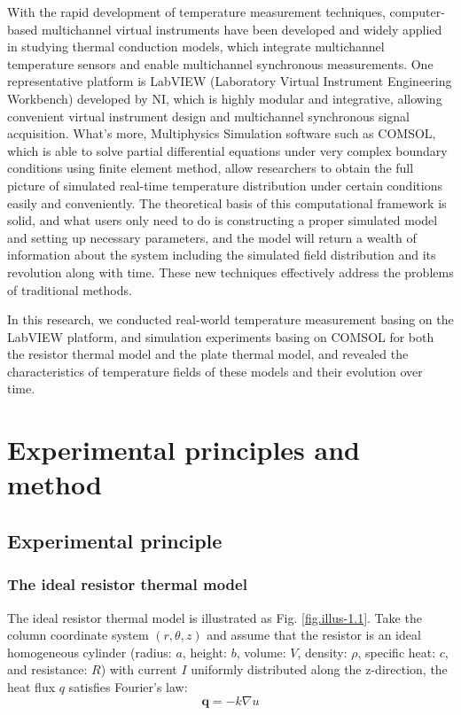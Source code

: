 \documentclass[10pt,a4paper,twocolumn,twoside,UTF8]{article}
\begin{document}
With the rapid development of temperature measurement techniques, computer-based multichannel virtual instruments have been developed and widely applied in studying thermal conduction models, 
which integrate multichannel temperature sensors and enable multichannel synchronous measurements.
One representative platform is LabVIEW (Laboratory Virtual Instrument Engineering Workbench) developed by NI, which is highly modular and integrative, 
allowing convenient virtual instrument design and multichannel synchronous signal acquisition. 
What's more, Multiphysics Simulation software such as COMSOL, which is able to solve partial differential equations under very complex boundary conditions using finite element method, 
allow researchers to obtain the full picture of simulated real-time temperature distribution under certain conditions easily and conveniently. 
The theoretical basis of this computational framework is solid, and what users only need to do is constructing a proper simulated model and setting up necessary parameters, 
and the model will return a wealth of information about the system including the simulated field distribution and its revolution along with time.
These new techniques effectively address the problems of traditional methods.

In this research, we conducted real-world temperature measurement basing on the LabVIEW platform, and simulation experiments basing on COMSOL for both the resistor thermal model and the plate thermal model, 
and revealed the characteristics of temperature fields of these models and their evolution over time.

\section{Experimental principles and method}
	\subsection{Experimental principle\autocite{shenGeneralPhysicsLaboratory2015}}
		\subsubsection{The ideal resistor thermal model}
		The ideal resistor thermal model is illustrated as Fig. \ref{fig.illus-1.1}. 
		Take the column coordinate system $(r, \theta, z)$ and assume that the resistor is an ideal homogeneous cylinder 
		(radius: $a$, height: $b$, volume: $V$, density: $\rho$, specific heat: $c$, and resistance: $R$) with current $I$ uniformly distributed along the z-direction, 
		the heat flux $q$ satisfies Fourier's law:
		\begin{equation}
			\boldsymbol{q} = -k \nabla u
			\label{eq.1.1}
		\end{equation}
\end{document}
